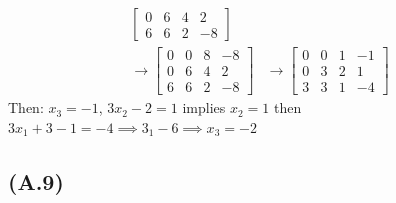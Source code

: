 \documentclass[]{article}
\begin{document}
\begin{align*}
\begin{bmatrix}
                    0 & 6 & 4 & 2
                    \\
                    6 & 6 & 2 & -8
                \end{bmatrix}
                \\
                \rightarrow
                \begin{bmatrix}
                    0 & 0 & 8 & -8
                    \\
                    0 & 6 & 4 & 2
                    \\
                    6 & 6 & 2 & -8
                \end{bmatrix}
                &\rightarrow
                \begin{bmatrix}
                    0 & 0 & 1 & -1
                    \\
                    0 & 3 & 2 & 1
                    \\
                    3 & 3 & 1 & -4
                \end{bmatrix}
            \end{align*}
        Then: $x_3 = -1$, $3x_2 - 2 = 1$ implies $x_2 = 1$ then $3x_1 + 3 - 1 = -4 \implies 3_1 -6 \implies x_3 = -2$
            
    \subsection*{(A.9)}
\end{document}

